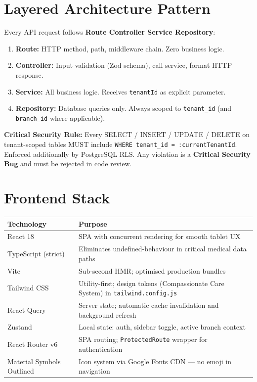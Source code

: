 \documentclass[12pt,a4paper]{report}
\begin{document}
\section{Layered Architecture Pattern}

Every API request follows \textbf{Route \textrightarrow{} Controller \textrightarrow{} Service \textrightarrow{} Repository}:

\begin{enumerate}
  \item \textbf{Route:} HTTP method, path, middleware chain. Zero business logic.
  \item \textbf{Controller:} Input validation (Zod schema), call service, format HTTP response.
  \item \textbf{Service:} All business logic. Receives \texttt{tenantId} as explicit parameter.
  \item \textbf{Repository:} Database queries only. Always scoped to \texttt{tenant\_id} (and \texttt{branch\_id} where applicable).
\end{enumerate}

\begin{mdframed}[style=ErrorBox]
\textbf{Critical Security Rule:} Every SELECT / INSERT / UPDATE / DELETE on tenant-scoped tables MUST include \texttt{WHERE tenant\_id = :currentTenantId}. Enforced additionally by PostgreSQL RLS. Any violation is a \textbf{Critical Security Bug} and must be rejected in code review.
\end{mdframed}

\section{Frontend Stack}

\begin{longtable}{L{3.5cm} L{10cm}}
\toprule
\textbf{Technology} & \textbf{Purpose} \\\midrule\endhead\bottomrule\endfoot
React 18            & SPA with concurrent rendering for smooth tablet UX \\
TypeScript (strict) & Eliminates undefined-behaviour in critical medical data paths \\
Vite                & Sub-second HMR; optimised production bundles \\
Tailwind CSS        & Utility-first; design tokens (Compassionate Care System) in \texttt{tailwind.config.js} \\
React Query         & Server state; automatic cache invalidation and background refresh \\
Zustand             & Local state: auth, sidebar toggle, active branch context \\
React Router v6     & SPA routing; \texttt{ProtectedRoute} wrapper for authentication \\
Material Symbols Outlined & Icon system via Google Fonts CDN --- no emoji in navigation \\
\end{longtable}
\end{document}
